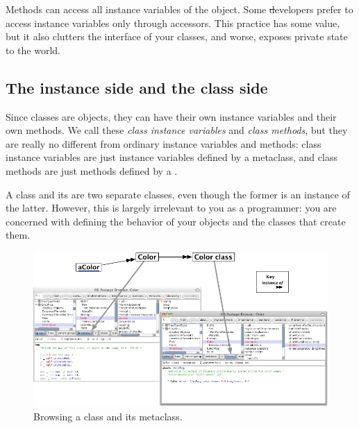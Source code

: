 \documentclass[a4paper,10pt,twoside]{book}
\begin{document}
Methods can access all instance variables of the object.
Some \st developers prefer to access instance variables only through accessors.
This practice has some value, but it also clutters the interface of your classes, and worse, exposes private state to the world.

\subsection{The instance side and the class side}

Since classes are objects, they can have their own instance variables and their own methods.
We call these \emph{class instance variables} and \emph{class methods}, but they are really no different from ordinary instance variables and methods:
class instance variables are just instance variables defined by a metaclass, and class methods are just methods defined by a . 

A class and its  are two separate classes, even though the former is an instance of the latter. 
However, this is largely irrelevant to you as a programmer: you are concerned with defining the behavior of your objects and the classes that create them.

\begin{figure}[htb]
\begin{center}
\includegraphics[width=\textwidth]{Color-Buttons}
\caption{Browsing a class and its metaclass.
\label{fig:Buttons}}
\end{center}
\end{figure}
\end{document}

